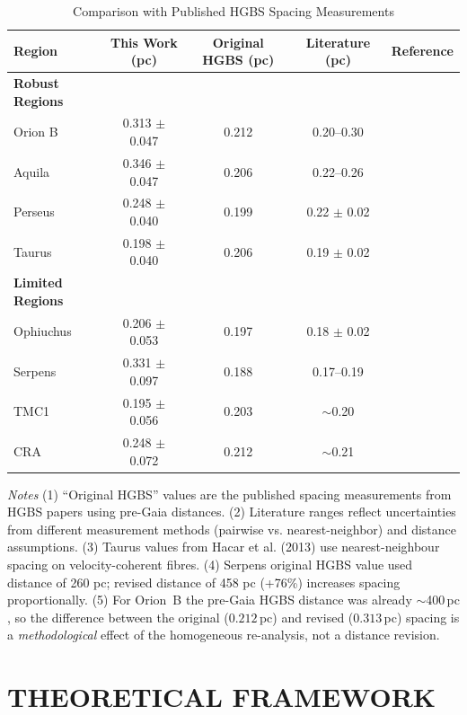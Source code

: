 \documentclass[usenatbib,twoside,twocolumn]{mnras}
\begin{document}
\begin{table}
\caption{Comparison with Published HGBS Spacing Measurements}
\label{tab:literature}
\begin{tabular}{lcccc}
\toprule
Region & This Work (pc) & Original HGBS (pc) & Literature (pc) & Reference \\
\midrule
\textbf{Robust Regions} &  &  &  &  \\
Orion B & 0.313 $\pm$ 0.047 & 0.212 & 0.20--0.30 & \citet{Konyves2020} \\
Aquila  & 0.346 $\pm$ 0.047 & 0.206 & 0.22--0.26 & \citet{Konyves2015} \\
Perseus & 0.248 $\pm$ 0.040 & 0.199 & 0.22 $\pm$ 0.02 & \citet{Pezzuto2021} \\
Taurus  & 0.198 $\pm$ 0.040 & 0.206 & 0.19 $\pm$ 0.02 & \citet{Hacar2013} \\
\midrule
\textbf{Limited Regions} &  &  &  &  \\
Ophiuchus & 0.206 $\pm$ 0.053 & 0.197 & 0.18 $\pm$ 0.02 & \citet{Konyves2020} \\
Serpens  & 0.331 $\pm$ 0.097 & 0.188 & 0.17--0.19 & \citet{Konyves2020} \\
TMC1     & 0.195 $\pm$ 0.056 & 0.203 & $\sim$0.20 & \citet{Hacar2013} \\
CRA      & 0.248 $\pm$ 0.072 & 0.212 & $\sim$0.21 & \citet{Konyves2020} \\
\bottomrule
\end{tabular}

\vspace{0.1in}
\footnotesize
\emph{Notes} (1) ``Original HGBS'' values are the published spacing measurements from HGBS papers using pre-Gaia distances. (2) Literature ranges reflect uncertainties from different measurement methods (pairwise vs. nearest-neighbor) and distance assumptions. (3) Taurus values from Hacar et al. (2013) use nearest-neighbour spacing on velocity-coherent fibres. (4) Serpens original HGBS value used distance of 260 pc; revised distance of 458 pc (+76\%) increases spacing proportionally. (5) For Orion~B the pre-Gaia HGBS distance was already $\sim$400\,pc \citep{Konyves2020}, so the difference between the original ($0.212$\,pc) and revised ($0.313$\,pc) spacing is a \emph{methodological} effect of the homogeneous re-analysis, not a distance revision.
\end{table}

\section{THEORETICAL FRAMEWORK}
\label{sec:theory}
\end{document}
